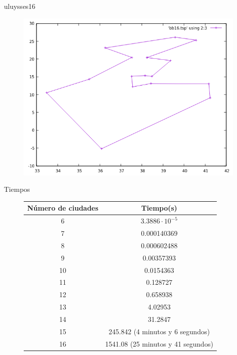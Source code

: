 \documentclass{beamer}
\begin{document}
\begin{frame}[fragile]{uluysses16}
\begin{figure}[H]
\centering
\includegraphics[scale=0.5]{bb16.png}
\end{figure}
\end{frame}

\begin{frame}[fragile]{Tiempos}
\begin{figure}[H]
\centering
\begin{tabular}{|c|c|}
\hline
\textbf{Número de ciudades} & \textbf{Tiempo(s)}\\
\hline
6 & $3.3886 \cdot 10^{-5}$\\
\hline
7 & 0.000140369\\
\hline
8 & 0.000602488\\
\hline
9 & 0.00357393\\
\hline
10 & 0.0154363\\
\hline
11 & 0.128727\\
\hline
12 & 0.658938\\
\hline
13 & 4.02953\\
\hline
14 & 31.2847\\
\hline
15 & 245.842 (4 minutos y 6 segundos)\\
\hline
16 & 1541.08 (25 minutos y 41 segundos)\\
\hline
\end{tabular}
\end{figure}
\end{frame}
\end{document}
